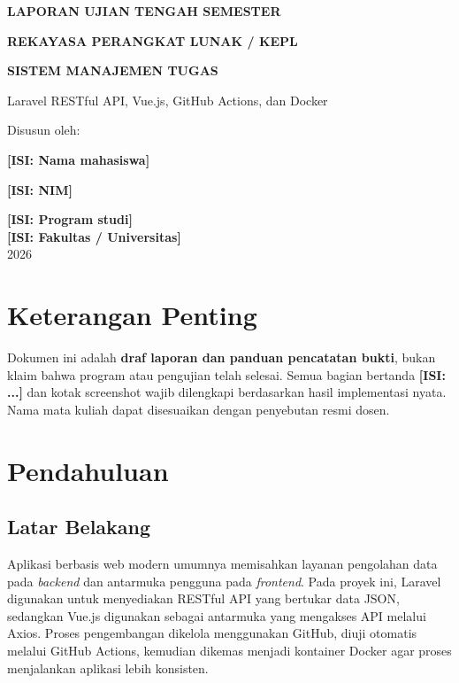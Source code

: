 \documentclass[12pt,a4paper]{report}
\newcommand{\isian}[1]{\textbf{[ISI: #1]}}
\begin{document}
\begin{titlepage}
\centering
\vspace*{1.1cm}
{\Large\bfseries LAPORAN UJIAN TENGAH SEMESTER\par}
\vspace{0.35cm}
{\Large\bfseries REKAYASA PERANGKAT LUNAK / KEPL\par}
\vspace{1cm}
{\Huge\bfseries SISTEM MANAJEMEN TUGAS\par}
\vspace{0.4cm}
{\Large Laravel RESTful API, Vue.js, GitHub Actions, dan Docker\par}
\vspace{1.8cm}
{\large Disusun oleh:\par}
\vspace{0.4cm}
{\Large\bfseries \isian{Nama mahasiswa}\par}
{\large \isian{NIM}\par}
\vfill
{\large \isian{Program studi}\\\isian{Fakultas / Universitas}\\2026\par}
\end{titlepage}
\chapter*{Keterangan Penting}
Dokumen ini adalah \textbf{draf laporan dan panduan pencatatan bukti}, bukan klaim bahwa program atau pengujian telah selesai. Semua bagian bertanda \textbf{[ISI: ...]} dan kotak screenshot wajib dilengkapi berdasarkan hasil implementasi nyata. Nama mata kuliah dapat disesuaikan dengan penyebutan resmi dosen.
\tableofcontents
\clearpage{}

\chapter{Pendahuluan}
\section{Latar Belakang}
Aplikasi berbasis web modern umumnya memisahkan layanan pengolahan data pada \textit{backend} dan antarmuka pengguna pada \textit{frontend}. Pada proyek ini, Laravel digunakan untuk menyediakan RESTful API yang bertukar data JSON, sedangkan Vue.js digunakan sebagai antarmuka yang mengakses API melalui Axios. Proses pengembangan dikelola menggunakan GitHub, diuji otomatis melalui GitHub Actions, kemudian dikemas menjadi kontainer Docker agar proses menjalankan aplikasi lebih konsisten.
\end{document}
